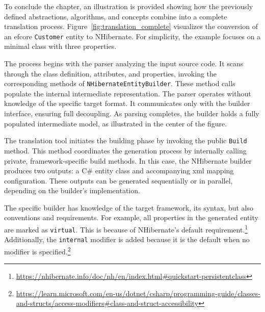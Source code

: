 \begin{example}
\small
To conclude the chapter, an illustration is provided showing how the previously defined abstractions, algorithms, and concepts combine into a complete translation process. Figure~\ref{fig:translation_complete} visualizes the conversion of an \acrshort{efcore} \texttt{Customer} entity to NHibernate. For simplicity, the example focuses on a minimal class with three properties.

The process begins with the parser analyzing the input source code. It scans through the class definition, attributes, and properties, invoking the corresponding methods of \texttt{NHibernateEntityBuilder}. These method calls populate the internal intermediate representation. The parser operates without knowledge of the specific target format. It communicates only with the builder interface, ensuring full decoupling. As parsing completes, the builder holds a fully populated intermediate model, as illustrated in the center of the figure. 

The translation tool initiates the building phase by invoking the public \texttt{Build} method. This method coordinates the generation process by internally calling private, framework-specific build methods. In this case, the NHibernate builder produces two outputs: a C\# entity class and accompanying \acrshort{xml} mapping configuration. These outputs can be generated sequentially or in parallel, depending on the builder's implementation.

The specific builder has knowledge of the target framework, its syntax, but also conventions and requirements. For example, all properties in the generated entity are marked as \texttt{virtual}. This is because of NHibernate's default requirement.\footnote{\url{https://nhibernate.info/doc/nh/en/index.html\#quickstart-persistentclass}} Additionally, the \texttt{internal} modifier is added because it is the default when no modifier is specified.\footnote{\url{https://learn.microsoft.com/en-us/dotnet/csharp/programming-guide/classes-and-structs/access-modifiers\#class-and-struct-accessibility}}


\end{example}
